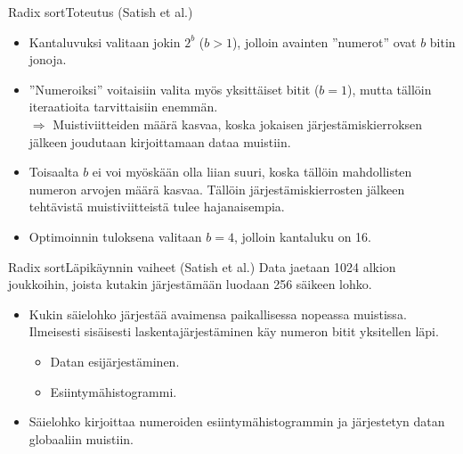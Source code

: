 \documentclass{beamer}
\begin{document}
\begin{frame}{Radix sort}{Toteutus (Satish et al.)}
\begin{itemize}
    \item
      Kantaluvuksi valitaan jokin $2^b$ ($b > 1$), jolloin avainten ''numerot'' ovat $b$ bitin jonoja.
    \item
      ''Numeroiksi'' voitaisiin valita myös yksittäiset bitit ($b = 1$), mutta tällöin iteraatioita tarvittaisiin enemmän. \\ $\Rightarrow$ Muistiviitteiden määrä kasvaa, koska jokaisen järjestämiskierroksen jälkeen joudutaan kirjoittamaan dataa muistiin.
    \item
      Toisaalta $b$ ei voi myöskään olla liian suuri, koska tällöin mahdollisten numeron arvojen määrä kasvaa. Tällöin järjestämiskierrosten jälkeen tehtävistä muistiviitteistä tulee hajanaisempia.
    \item
      Optimoinnin tuloksena valitaan $b = 4$, jolloin kantaluku on 16.
\end{itemize}
\end{frame}

\begin{frame}{Radix sort}{Läpikäynnin vaiheet (Satish et al.)}
Data jaetaan 1024 alkion joukkoihin, joista kutakin järjestämään luodaan 256 säikeen lohko.
\begin{itemize}
  \item
    Kukin säielohko järjestää avaimensa paikallisessa nopeassa muistissa. Ilmeisesti sisäisesti laskentajärjestäminen käy numeron bitit yksitellen läpi.
    \begin{itemize}
      \item
        Datan esijärjestäminen.
      \item
        Esiintymähistogrammi.
    \end{itemize}
  \item
    Säielohko kirjoittaa numeroiden esiintymähistogrammin ja järjestetyn datan globaaliin muistiin.
\end{itemize}
\end{frame}
\end{document}
